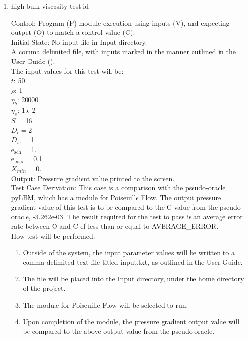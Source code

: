 \documentclass[12pt, titlepage]{article}
\newcounter{testcounter} %
\begin{document}
\begin{enumerate}
\item{high-bulk-viscosity-test-id\thetestcounter \\}

Control: Program (P) module execution using inputs (V), and expecting output (O) to match a control value (C).\\
					
Initial State: No input file in Input directory.\\
					
A comma delimited file, with inputs marked in the manner outlined in the User
Guide (\citet{LBM_UserGuide_PM}).\\The input values for this test will be:\\
$t$: 50\\
$\rho$: 1\\
$\eta_b$: 20000\\
$\eta_s$: 1.e-2\\
$S$ = 16\\
$D_{l}$ = 2\\
$D_{w}$ = 1\\
$\mathrm{e_{sch}}$ = 1.\\
$\mathrm{e_{max}}$ = 0.1\\
$X_{min}$ = 0.\\

Output: Pressure gradient value printed to the screen.  \\

Test Case Derivation: This case is a comparison with the pseudo-oracle pyLBM,
which has a module for Poiseuille Flow. The output pressure gradient value of
this test is to be compared to the C value from the pseudo-oracle,
-3.262e-03. The result required for the test to pass is an average error rate
between O and C of less than or equal to AVERAGE\_ERROR.\\

How test will be performed: 

\begin{enumerate}
\item Outside of the system, the input parameter values will be written to a
comma delimited text file titled input.txt, as outlined in the User Guide.
\item The file will be placed into the Input directory, under the home directory
of the project.
\item The module for Poiseuille Flow will be selected to run.
\item Upon completion of the module, the pressure gradient output value will be
compared to the above output value from the pseudo-oracle.
\end{enumerate}	


\end{enumerate}
\end{document}
